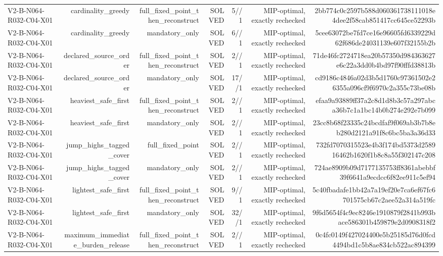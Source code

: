 {\begin{longtable}{lrrrrrr}
V2-B-N064-R032-C04-X01 & cardinality\_greedy & full\_fixed\_point\_then\_reconstruct & SOLVED & 5//1 & MIP-optimal, exactly rechecked & 2bb774c0c2597b588d060361738111018e4dee2f58cab851417cc645ce52293b \\
V2-B-N064-R032-C04-X01 & cardinality\_greedy & mandatory\_only & SOLVED & 6//1 & MIP-optimal, exactly rechecked & 5cee63072be7fd7ce16e96605fd6339229d62f686de24031139e607f32155b2b \\
V2-B-N064-R032-C04-X01 & declared\_source\_order & full\_fixed\_point\_then\_reconstruct & SOLVED & 2//1 & MIP-optimal, exactly rechecked & 71de46fc2724718ea20b57350d984363627e6c22a3dd0b4bd97f90fffd38813b \\
V2-B-N064-R032-C04-X01 & declared\_source\_order & mandatory\_only & SOLVED & 17//1 & MIP-optimal, exactly rechecked & cd9186c4846a02d3b5d1760c97361502e26355a096cf9f6970c2a355c73be08b \\
V2-B-N064-R032-C04-X01 & heaviest\_safe\_first & full\_fixed\_point\_then\_reconstruct & SOLVED & 2//1 & MIP-optimal, exactly rechecked & efaa9a93889ff37a2c8d1d8b3c57a297abca36b7c1a1bc14b0b274e292e7b099 \\
V2-B-N064-R032-C04-X01 & heaviest\_safe\_first & mandatory\_only & SOLVED & 2//1 & MIP-optimal, exactly rechecked & 23cc8b68f23335c24bcdfaf9f069ab3b7b8eb280d2121a91f8c6bc5ba3a36d33 \\
V2-B-N064-R032-C04-X01 & jump\_highs\_tagged\_cover & full\_fixed\_point & SOLVED & 2//1 & MIP-optimal, exactly rechecked & 732fd7070315523e4b3f174bd5373d258916462b1620f1b8c8a55f302147c208 \\
V2-B-N064-R032-C04-X01 & jump\_highs\_tagged\_cover & mandatory\_only & SOLVED & 2//1 & MIP-optimal, exactly rechecked & 724ae8909b09d7177135753ff8361abebbf39f6641a9ecdcc6f82ee911c5ef94 \\
V2-B-N064-R032-C04-X01 & lightest\_safe\_first & full\_fixed\_point\_then\_reconstruct & SOLVED & 9//1 & MIP-optimal, exactly rechecked & 5c40fbadafe1bb42a7a19ef20e7ca6ef67fc6701575cb67c2aee52a314a519fc \\
V2-B-N064-R032-C04-X01 & lightest\_safe\_first & mandatory\_only & SOLVED & 32//1 & MIP-optimal, exactly rechecked & 9f6d5654f4c9ec8246e1910879f2841b993bace586301b459879e2d0908318f2 \\
V2-B-N064-R032-C04-X01 & maximum\_immediate\_burden\_release & full\_fixed\_point\_then\_reconstruct & SOLVED & 2//1 & MIP-optimal, exactly rechecked & 0c4fc0149f427024400e5b25185d76d0fcd4494bd1c5b8ae834cb522ac894399 \\

\end{longtable}}
